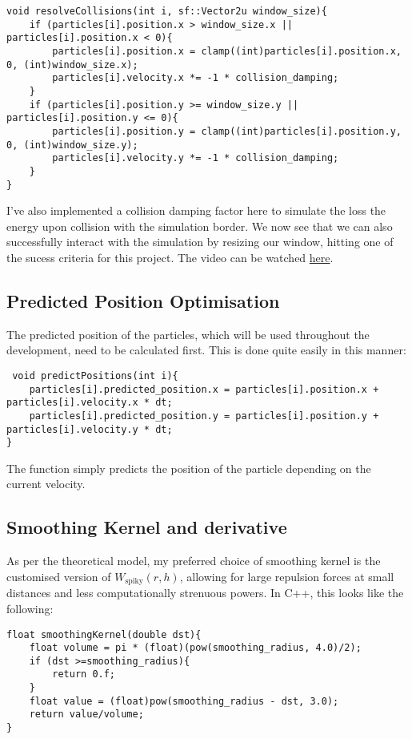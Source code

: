 \documentclass[write-up.tex]{subfiles}
\begin{document}
\begin{lstlisting}
void resolveCollisions(int i, sf::Vector2u window_size){
    if (particles[i].position.x > window_size.x || particles[i].position.x < 0){
        particles[i].position.x = clamp((int)particles[i].position.x, 0, (int)window_size.x);
        particles[i].velocity.x *= -1 * collision_damping;
    }
    if (particles[i].position.y >= window_size.y || particles[i].position.y <= 0){
        particles[i].position.y = clamp((int)particles[i].position.y, 0, (int)window_size.y);
        particles[i].velocity.y *= -1 * collision_damping;
    }
}
\end{lstlisting}

I've also implemented a collision damping factor here to simulate the loss the energy upon collision with the simulation border. We now see that we can also successfully interact with the simulation by resizing our window, hitting one of the sucess criteria for this project. The video can be watched \href{https://youtube.com/shorts/wO0xUBSKVck?feature=share}{here}.
\subsection{Predicted Position Optimisation}

The predicted position of the particles, which will be used throughout the development, need to be calculated first. This is done quite easily in this manner:

\begin{lstlisting}
 void predictPositions(int i){
    particles[i].predicted_position.x = particles[i].position.x + particles[i].velocity.x * dt;
    particles[i].predicted_position.y = particles[i].position.y + particles[i].velocity.y * dt;
}
\end{lstlisting}
The function simply predicts the position of the particle depending on the current velocity.


\subsection{Smoothing Kernel and derivative}

As per the theoretical model, my preferred choice of smoothing kernel is the customised version of $W_{\text{spiky}}(r, h)$, allowing for large repulsion forces at small distances and less computationally strenuous powers. In C++, this looks like the following:

\begin{lstlisting}
float smoothingKernel(double dst){
    float volume = pi * (float)(pow(smoothing_radius, 4.0)/2);
    if (dst >=smoothing_radius){
        return 0.f;
    }
    float value = (float)pow(smoothing_radius - dst, 3.0);
    return value/volume;
}
\end{lstlisting}
\end{document}
